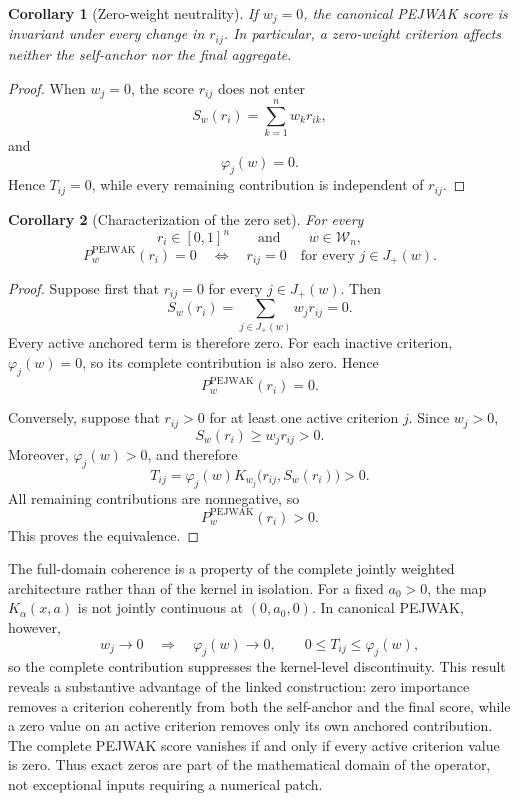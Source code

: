 \documentclass[reqno,11pt]{amsart}
\theoremstyle{definition}
\theoremstyle{plain}
\newtheorem{corollary}{Corollary}
\theoremstyle{remark}
\begin{document}
\begin{corollary}[Zero-weight neutrality]
\label{cor:zero-weight-neutrality}
If \(w_j=0\), the canonical PEJWAK score is invariant under every change
in \(r_{ij}\). In particular, a zero-weight criterion affects neither
the self-anchor nor the final aggregate.
\end{corollary}

\begin{proof}
When \(w_j=0\), the score \(r_{ij}\) does not enter
\[
S_w(r_i)
=
\sum_{k=1}^{n}w_kr_{ik},
\]
and
\[
\varphi_j(w)=0.
\]
Hence \(T_{ij}=0\), while every remaining contribution is independent
of \(r_{ij}\).
\end{proof}

\begin{corollary}[Characterization of the zero set]
\label{cor:zero-set}
For every
\[
r_i\in[0,1]^n
\qquad\text{and}\qquad
w\in\mathcal W_n,
\]
\begin{equation}
P_w^{\mathrm{PEJWAK}}(r_i)=0
\quad\Longleftrightarrow\quad
r_{ij}=0
\quad
\text{for every }j\in J_{+}(w).
\label{eq:zero-set}
\end{equation}
\end{corollary}

\begin{proof}
Suppose first that \(r_{ij}=0\) for every \(j\in J_{+}(w)\).
Then
\[
S_w(r_i)
=
\sum_{j\in J_{+}(w)}w_jr_{ij}
=
0.
\]
Every active anchored term is therefore zero. For each inactive
criterion, \(\varphi_j(w)=0\), so its complete contribution is also
zero. Hence
\[
P_w^{\mathrm{PEJWAK}}(r_i)=0.
\]

Conversely, suppose that \(r_{ij}>0\) for at least one active criterion
\(j\). Since \(w_j>0\),
\[
S_w(r_i)
\geq
w_jr_{ij}
>
0.
\]
Moreover, \(\varphi_j(w)>0\), and therefore
\[
T_{ij}
=
\varphi_j(w)
K_{w_j}\bigl(r_{ij},S_w(r_i)\bigr)
>
0.
\]
All remaining contributions are nonnegative, so
\[
P_w^{\mathrm{PEJWAK}}(r_i)>0.
\]
This proves the equivalence.
\end{proof}

The full-domain coherence is a property of the complete jointly weighted
architecture rather than of the kernel in isolation. For a fixed
\(a_0>0\), the map \(K_\alpha(x,a)\) is not jointly continuous at
\((0,a_0,0)\). In canonical PEJWAK, however,
\[
w_j\longrightarrow0
\quad\Longrightarrow\quad
\varphi_j(w)\longrightarrow0,
\qquad
0\leq T_{ij}\leq\varphi_j(w),
\]
so the complete contribution suppresses the kernel-level discontinuity.
This result reveals a substantive advantage of the linked construction:
zero importance removes a criterion coherently from both the self-anchor
and the final score, while a zero value on an active criterion removes
only its own anchored contribution. The complete PEJWAK score vanishes
if and only if every active criterion value is zero. Thus exact zeros are
part of the mathematical domain of the operator, not exceptional inputs
requiring a numerical patch.
\end{document}
